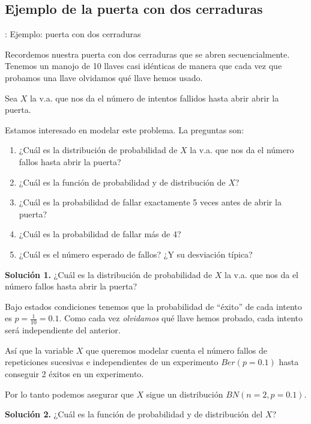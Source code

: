 \documentclass[
  letterpaper,
  DIV=11,
  numbers=noendperiod]{scrreprt}
\providecommand{\tightlist}{%
  \setlength{\itemsep}{0pt}\setlength{\parskip}{0pt}}\usepackage{longtable,booktabs,array}
\begin{document}
\subsection{Ejemplo de la puerta con dos
cerraduras}\label{ejemplo-de-la-puerta-con-dos-cerraduras}

\begin{Ejemplo}{: Ejemplo: puerta con dos cerraduras}{}

Recordemos nuestra puerta con dos cerraduras que se abren
secuencialmente. Tenemos un manojo de 10 llaves casi idénticas de manera
que cada vez que probamos una llave olvidamos qué llave hemos usado.

Sea \(X\) la v.a. que nos da el número de intentos fallidos hasta abrir
abrir la puerta.

Estamos interesado en modelar este problema. La preguntas son:

\begin{enumerate}
\def\labelenumi{\arabic{enumi}.}
\tightlist
\item
  ¿Cuál es la distribución de probabilidad de \(X\) la v.a. que nos da
  el número fallos hasta abrir la puerta?
\item
  ¿Cuál es la función de probabilidad y de distribución de \(X\)?
\item
  ¿Cuál es la probabilidad de fallar exactamente 5 veces antes de abrir
  la puerta?
\item
  ¿Cuál es la probabilidad de fallar más de 4?
\item
  ¿Cuál es el número esperado de fallos? ¿Y su desviación típica?
\end{enumerate}

\textbf{Solución 1.} ¿Cuál es la distribución de probabilidad de \(X\)
la v.a. que nos da el número fallos hasta abrir la puerta?

Bajo estados condiciones tenemos que la probabilidad de ``éxito'' de
cada intento es \(p=\frac{1}{10}=0.1\). Como cada vez \emph{olvidamos}
qué llave hemos probado, cada intento será independiente del anterior.

Así que la variable \(X\) que queremos modelar cuenta el número fallos
de repeticiones sucesivas e independientes de un experimento
\(Ber(p=0.1)\) hasta conseguir 2 éxitos en un experimento.

Por lo tanto podemos asegurar que \(X\) sigue un distribución
\(BN(n=2,p=0.1).\)

\textbf{Solución 2.} ¿Cuál es la función de probabilidad y de
distribución del \(X\)?


\end{Ejemplo}
\end{document}
